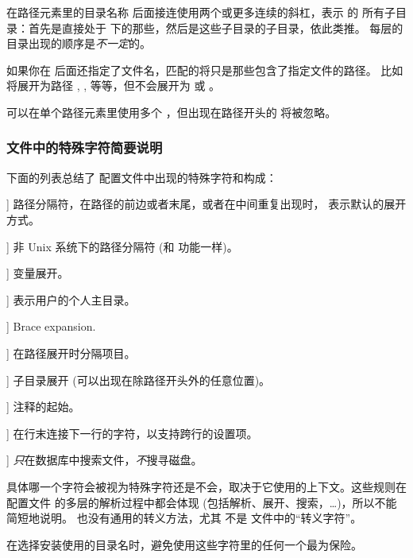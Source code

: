 \documentclass{article}
\begin{document}
在路径元素里的目录名称  后面接连使用两个或更多连续的斜杠，表示  的
所有子目录：首先是直接处于  下的那些，然后是这些子目录的子目录，依此类推。
每层的目录出现的顺序是\emph{不一定}的。

如果你在 \samp{//} 后面还指定了文件名，匹配的将只是那些包含了指定文件的路径。
比如  将展开为路径 , ,
 等等，但不会展开为  或 。

可以在单个路径元素里使用多个 \samp{//}，但出现在路径开头的 \samp{//}
将被忽略。

\subsubsection{ 文件中的特殊字符简要说明}
\label{sec:cnf-special-chars}

下面的列表总结了 \KPS{} 配置文件中出现的特殊字符和构成：

\newcommand{\CODE}[1]{\makebox[3em][l]{\code{#1}}}
\begin{ttdescription}
  \item[\CODE{:}] 路径分隔符，在路径的前边或者末尾，或者在中间重复出现时，
  表示默认的展开方式。\par
  \item[\CODE{;}] 非 Unix 系统下的路径分隔符 (和 \code{:} 功能一样)。
  \item[\CODE{\$}] 变量展开。
  \item[\CODE{\string~}] 表示用户的个人主目录。
  \item[\CODE{\char`\{...\char`\}}] Brace expansion.
  \item[\CODE{,}] 在路径展开时分隔项目。
  \item[\CODE{//}] 子目录展开 (可以出现在除路径开头外的任意位置)。
  \item[\CODE{\%}] 注释的起始。
  \item[\CODE{\bs}] 在行末连接下一行的字符，以支持跨行的设置项。
  \item[\CODE{!!}] \emph{只}在数据库中搜索文件，\emph{不}搜寻磁盘。
\end{ttdescription}

具体哪一个字符会被视为特殊字符还是不会，取决于它使用的上下文。这些规则在配置文件
的多层的解析过程中都会体现 (包括解析、展开、搜索，\ldots)，所以不能简短地说明。
也没有通用的转义方法，尤其 \samp{\bs} 不是  文件中的“转义字符”。

在选择安装使用的目录名时，避免使用这些字符里的任何一个最为保险。
\end{document}
